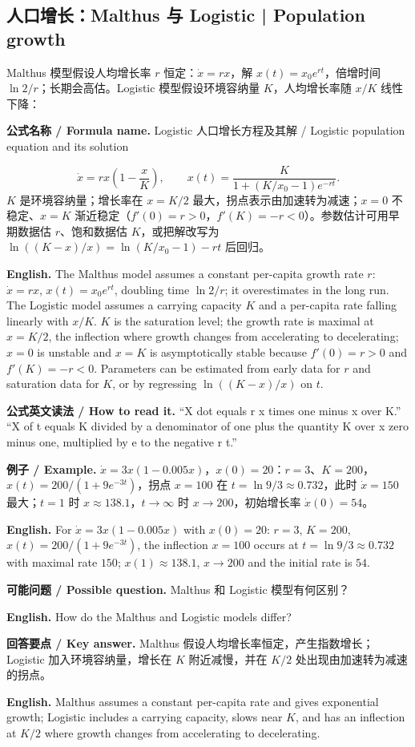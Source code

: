 \documentclass[UTF8,11pt,a4paper]{ctexart}
\newcommand{\EN}[1]{\par\noindent\textbf{English.} #1\par}
\newcommand{\READ}[1]{\par\noindent\textbf{公式英文读法 / How to read it.} #1\par}
\newcommand{\FORMULA}[2]{\par\noindent\textbf{公式名称 / Formula name.} #1 / #2\par}
\newcommand{\EX}[2]{\par\noindent\textbf{例子 / Example.} #1\par\EN{#2}}
\newcommand{\ASK}[4]{\par\noindent\textbf{可能问题 / Possible question.} #1\par\EN{#2}\noindent\textbf{回答要点 / Key answer.} #3\par\EN{#4}\smallskip}
\begin{document}
\subsection{人口增长：Malthus 与 Logistic | Population growth}
Malthus 模型假设人均增长率 $r$ 恒定：$\dot x=rx$，解 $x(t)=x_0e^{rt}$，倍增时间 $\ln2/r$；长期会高估。Logistic 模型假设环境容纳量 $K$，人均增长率随 $x/K$ 线性下降：
\FORMULA{Logistic 人口增长方程及其解}{Logistic population equation and its solution}
\[
\dot x=rx\left(1-\frac{x}{K}\right),\qquad
x(t)=\frac{K}{1+(K/x_0-1)e^{-rt}} .
\]
$K$ 是环境容纳量；增长率在 $x=K/2$ 最大，拐点表示由加速转为减速；$x=0$ 不稳定、$x=K$ 渐近稳定（$f'(0)=r>0$，$f'(K)=-r<0$）。参数估计可用早期数据估 $r$、饱和数据估 $K$，或把解改写为 $\ln((K-x)/x)=\ln(K/x_0-1)-rt$ 后回归。
\EN{The Malthus model assumes a constant per-capita growth rate $r$: $\dot x=rx$, $x(t)=x_0e^{rt}$, doubling time $\ln2/r$; it overestimates in the long run. The Logistic model assumes a carrying capacity $K$ and a per-capita rate falling linearly with $x/K$. $K$ is the saturation level; the growth rate is maximal at $x=K/2$, the inflection where growth changes from accelerating to decelerating; $x=0$ is unstable and $x=K$ is asymptotically stable because $f'(0)=r>0$ and $f'(K)=-r<0$. Parameters can be estimated from early data for $r$ and saturation data for $K$, or by regressing $\ln((K-x)/x)$ on $t$.}
\READ{“X dot equals r x times one minus x over K.” “X of t equals K divided by a denominator of one plus the quantity K over x zero minus one, multiplied by e to the negative r t.”}
\EX{$\dot x=3x(1-0.005x)$，$x(0)=20$：$r=3$、$K=200$，$x(t)=200/(1+9e^{-3t})$，拐点 $x=100$ 在 $t=\ln9/3\approx0.732$，此时 $\dot x=150$ 最大；$t=1$ 时 $x\approx138.1$，$t\to\infty$ 时 $x\to200$，初始增长率 $\dot x(0)=54$。}{For $\dot x=3x(1-0.005x)$ with $x(0)=20$: $r=3$, $K=200$, $x(t)=200/(1+9e^{-3t})$, the inflection $x=100$ occurs at $t=\ln9/3\approx0.732$ with maximal rate $150$; $x(1)\approx138.1$, $x\to200$ and the initial rate is $54$.}
\ASK{Malthus 和 Logistic 模型有何区别？}{How do the Malthus and Logistic models differ?}{Malthus 假设人均增长率恒定，产生指数增长；Logistic 加入环境容纳量，增长在 $K$ 附近减慢，并在 $K/2$ 处出现由加速转为减速的拐点。}{Malthus assumes a constant per-capita rate and gives exponential growth; Logistic includes a carrying capacity, slows near $K$, and has an inflection at $K/2$ where growth changes from accelerating to decelerating.}
\end{document}
